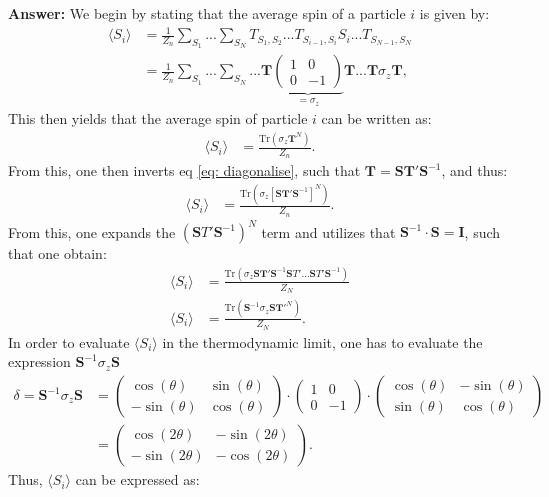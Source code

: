 \documentclass[a4paper]{article}
\newcommand{\trace}{\text{Tr}}
\newcommand{\newparagraph}{\vspace{.5cm}\noindent}
\newcommand{\average}[1]{\langle #1 \rangle}
\begin{document}
\newparagraph
\textbf{Answer:} We begin by stating that the average spin of a particle $i$ is given by:
\begin{align*}
    \average{S_i} &=\frac{1}{Z_n}\sum_{S_1}...\sum_{S_{N}}T_{S_1, S_2}...T_{S_{i-1}, S_{i}}S_i... T_{S_{N-1}, S_N}\\
    &= \frac{1}{Z_n}\sum_{S_1}...\sum_{S_N}...\mathbf{T}\underbrace{\begin{pmatrix}1&0\\0&-1\end{pmatrix}}_{=\sigma_z}\mathbf{T}...\mathbf{T}\sigma_z\mathbf{T},
\end{align*}This then yields that the average spin of particle $i$ can be written as:
\begin{align*}
    \average{S_i} &=\frac{\trace\left(\sigma_z\mathbf{T}^N\right)}{Z_n}.
\end{align*}From this, one then inverts eq \eqref{eq: diagonalise}, such that $\mathbf{T} = \mathbf{S}\mathbf{T}'\mathbf{S}^{-1}$, and thus:
\begin{align*}
    \average{S_i} &= \frac{\trace\left(\sigma_z \left[\mathbf{S}\mathbf{T}'\mathbf{S}^{-1}\right]^N\right)}{Z_n}.
\end{align*}From this, one expands the $(\mathbf{S}T'\mathbf{S}^{-1})^N$ term and utilizes that $\mathbf{S}^{-1}\cdot\mathbf{S} = \mathbf{I}$, such that one obtain:
\begin{align*}
    \average{S_i} &= \frac{\trace\left(\sigma_z\mathbf{S}\mathbf{T}'\mathbf{S}^{-1}\mathbf{S}T'...\mathbf{S}T'\mathbf{S}^{-1}\right)}{Z_N}\\
    \average{S_i} &= \frac{\trace\left(\mathbf{S}^{-1}\sigma_z\mathbf{S}\mathbf{T}'^N\right)}{Z_N}.
\end{align*}In order to evaluate $\average{S_i}$ in the thermodynamic limit, one has to evaluate the expression $\mathbf{S}^{-1}\sigma_z\mathbf{S}$
\begin{align*}
    \delta = \mathbf{S}^{-1}\sigma_z\mathbf{S} &= \begin{pmatrix}
        \cos(\theta) & \sin(\theta)\\
        -\sin(\theta) &\cos(\theta)
    \end{pmatrix}\cdot\begin{pmatrix}
        1 & 0 \\
        0 & -1
    \end{pmatrix}\cdot\begin{pmatrix}
        \cos(\theta) & -\sin(\theta)\\
        \sin(\theta) &\cos(\theta)
    \end{pmatrix}\\ &= \begin{pmatrix}
        \cos(2\theta) & -\sin(2\theta)\\
        -\sin(2\theta) &-\cos(2\theta)
    \end{pmatrix}.
\end{align*}Thus, $\average{S_i}$ can be expressed as:
\end{document}
